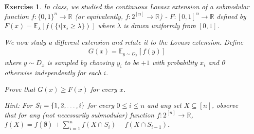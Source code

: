 \documentclass[12pt]{article}
\theoremstyle{colon}
\newtheorem{exercise}{Exercise}
\begin{document}
\clearpage

\begin{exercise}
  In class, we studied the continuous Lovasz extension of a submodular function $f: \{0,1\}^n \rightarrow \mathbb{R}$ (or equivalently, $f: 2^{[n]} \rightarrow \mathbb{R}$) - $F : [0,1]^n \rightarrow \mathbb{R}$ defined by $F(x) = \mathbb{E}_{\lambda}[f(\{i | x_i \geq \lambda \})]$ where $\lambda$ is drawn uniformly from $[0,1]$.

  We now study a different extension and relate it to the Lovasz extension. Define
  \begin{gather*}
    G(x) = \mathbb{E}_{y \sim D_x} [f(y)]
  \end{gather*}
  where $y \sim D_x$ is sampled by choosing $y_i$ to be $+1$ with probability $x_i$ and 0 otherwise independently for each $i$.

  Prove that $G(x) \geq F(x)$ for every $x$.

  Hint: For $S_i = \{1,2,\mathellipsis,i\}$ for every $0 \leq i \leq n$ and any set $X \subseteq [n]$, observe that for any (not necessarily submodular) function $f: 2^{[n]} \rightarrow \mathbb{R}$, $f(X) = f(\emptyset) + \sum_{i=1}^n f(X \cap S_i) - f(X \cap S_{i-1})$.
\end{exercise}
\end{document}
